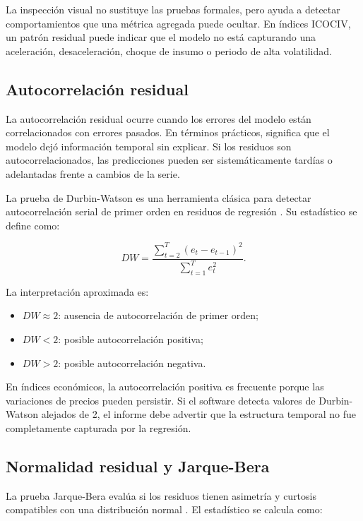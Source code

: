 La inspección visual no sustituye las pruebas formales, pero ayuda a detectar comportamientos que una métrica agregada puede ocultar. En índices ICOCIV, un patrón residual puede indicar que el modelo no está capturando una aceleración, desaceleración, choque de insumo o periodo de alta volatilidad.

\subsection{Autocorrelación residual}

La autocorrelación residual ocurre cuando los errores del modelo están correlacionados con errores pasados. En términos prácticos, significa que el modelo dejó información temporal sin explicar. Si los residuos son autocorrelacionados, las predicciones pueden ser sistemáticamente tardías o adelantadas frente a cambios de la serie.

La prueba de Durbin-Watson es una herramienta clásica para detectar autocorrelación serial de primer orden en residuos de regresión \parencite{statsmodels_durbin_watson}. Su estadístico se define como:

\begin{equation}
    DW = \frac{\sum_{t=2}^{T}(e_t-e_{t-1})^2}{\sum_{t=1}^{T}e_t^2}.
    \label{eq:durbin_watson}
\end{equation}

La interpretación aproximada es:

\begin{itemize}
    \item \(DW \approx 2\): ausencia de autocorrelación de primer orden;
    \item \(DW < 2\): posible autocorrelación positiva;
    \item \(DW > 2\): posible autocorrelación negativa.
\end{itemize}

En índices económicos, la autocorrelación positiva es frecuente porque las variaciones de precios pueden persistir. Si el software detecta valores de Durbin-Watson alejados de 2, el informe debe advertir que la estructura temporal no fue completamente capturada por la regresión.

\subsection{Normalidad residual y Jarque-Bera}

La prueba Jarque-Bera evalúa si los residuos tienen asimetría y curtosis compatibles con una distribución normal \parencite{statsmodels_jarque_bera}. El estadístico se calcula como:

